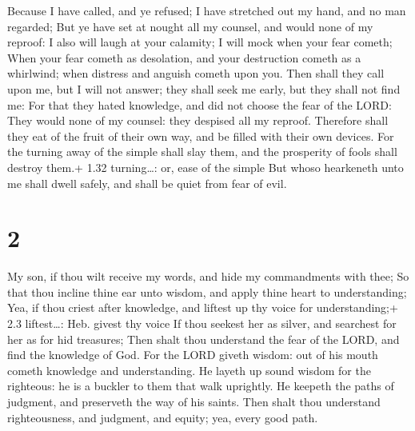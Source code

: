  Because I have called, and ye refused; I have stretched
out my hand, and no man regarded;  But ye have set at
nought all my counsel, and would none of my reproof:  I
also will laugh at your calamity; I will mock when your fear cometh;
 When your fear cometh as desolation, and your destruction
cometh as a whirlwind; when distress and anguish cometh upon you.
 Then shall they call upon me, but I will not answer; they
shall seek me early, but they shall not find me:  For that
they hated knowledge, and did not choose the fear of the LORD:
 They would none of my counsel: they despised all my
reproof.  Therefore shall they eat of the fruit of their
own way, and be filled with their own devices.  For the
turning away of the simple shall slay them, and the prosperity of fools
shall destroy them.+ 1.32 turning\ldots: or, ease of the simple
 But whoso hearkeneth unto me shall dwell safely, and shall
be quiet from fear of evil.

\hypertarget{section-1}{%
\section{2}\label{section-1}}

 My son, if thou wilt receive my words, and hide my
commandments with thee;  So that thou incline thine ear unto
wisdom, and apply thine heart to understanding;  Yea, if
thou criest after knowledge, and liftest up thy voice for
understanding;+ 2.3 liftest\ldots: Heb. givest thy voice  If
thou seekest her as silver, and searchest for her as for hid treasures;
 Then shalt thou understand the fear of the LORD, and find
the knowledge of God.  For the LORD giveth wisdom: out of
his mouth cometh knowledge and understanding.  He layeth up
sound wisdom for the righteous: he is a buckler to them that walk
uprightly.  He keepeth the paths of judgment, and preserveth
the way of his saints.  Then shalt thou understand
righteousness, and judgment, and equity; yea, every good path.

